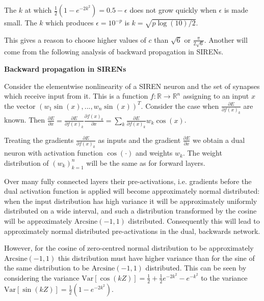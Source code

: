 \documentclass{letter}
\begin{document}
The $k$ at which $\frac{1}{2}(1-e^{-2k^2})=0.5-\epsilon$ does not grow quickly when $\epsilon$ is made small. The $k$ which produces $\epsilon=10^{-p}$ is $k=\sqrt{p\log(10)/2}$.

\begin{center}
\end{center}

This gives a reason to choose higher values of $c$ than $\sqrt{6}$ or $\frac{\pi}{2\sqrt{6}}$. Another will come from the following analysis of backward propagation in SIRENs.

{\bf Backward propagation in SIRENs}

Consider the elementwise nonlinearity of a SIREN neuron and the set of synapses which receive input from it. This is a function $f:\mathbb{R}\rightarrow \mathbb{R}^n$ assigning to an input $x$ the vector $\left(w_{1}\sin(x),...,w_{n}\sin(x)\right)^T$. Consider the case when $\frac{\partial E}{\partial f(x)_k}$ are known. Then $\frac{\partial E}{\partial x}=\frac{\partial E}{\partial f(x)_k}\frac{\partial f(x)_k}{\partial x}=\sum_k \frac{\partial E}{\partial f(x)_k}w_{k}\cos(x)$. 

Treating the gradients $\frac{\partial E}{\partial f(x)_k}$ as inputs and the gradient $\frac{\partial E}{\partial x}$ we obtain a dual neuron with activation function $\cos(\cdot)$ and weights $w_k$. The weight distribution of $\left(w_k\right)_{k=1}^n$ will be the same as for forward layers. 

Over many fully connected layers their pre-activations, i.e. gradients before the dual activation function is applied will become approximately normal distributed: when the input distribution has high variance it will be approximately uniformly distributed on a wide interval, and such a distribution transformed by the cosine will be approximately $\text{Arcsine}(-1,1)$ distributed. Consequently this will lead to approximately normal distributed pre-activations in the dual, backwards network.

However, for the cosine of zero-centred normal distribution to be approximately $\text{Arcsine}(-1,1)$ this distribution must have higher variance than for the sine of the same distribution to be $\text{Arcsine}(-1,1)$ distributed. This can be seen by considering the variance $\text{Var}\left[\cos(kZ)\right] = \frac{1}{2} + \frac{1}{2}e^{-2k^2}-e^{-k^2}$ to the variance $\text{Var}\left[\sin(kZ)\right]=\frac{1}{2}(1-e^{-2k^2})$.
\end{document}
